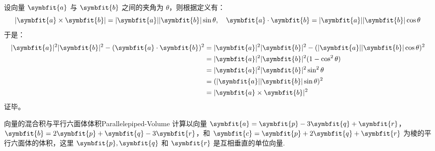 \begin{myproof}
    设向量 $\symbfit{a}$ 与 $\symbfit{b}$ 之间的夹角为 $\theta$，则根据定义有：
    \begin{equation*}
        |\symbfit{a} \times \symbfit{b}| = |\symbfit{a}| |\symbfit{b}| \sin \theta, \quad \symbfit{a} \cdot \symbfit{b} = |\symbfit{a}| |\symbfit{b}| \cos \theta
    \end{equation*}
    于是：
    \begin{equation*}
        \begin{aligned}
            |\symbfit{a}|^2 |\symbfit{b}|^2 - (\symbfit{a} \cdot \symbfit{b})^2 & = |\symbfit{a}|^2 |\symbfit{b}|^2 - (|\symbfit{a}| |\symbfit{b}| \cos \theta)^2 \\
                                                                                & = |\symbfit{a}|^2 |\symbfit{b}|^2 (1 - \cos^2 \theta)                           \\
                                                                                & = |\symbfit{a}|^2 |\symbfit{b}|^2 \sin^2 \theta                                 \\
                                                                                & = (|\symbfit{a}| |\symbfit{b}| \sin \theta)^2                                   \\
                                                                                & = |\symbfit{a} \times \symbfit{b}|^2
        \end{aligned}
    \end{equation*}
    证毕。
\end{myproof}


\begin{problem}{向量的混合积与平行六面体体积}{Parallelepiped-Volume}
    计算以向量 $\symbfit{a} = \symbfit{p} - 3\symbfit{q} + \symbfit{r}$，$\symbfit{b} = 2\symbfit{p} + \symbfit{q} - 3\symbfit{r}$，和 $\symbfit{c} = \symbfit{p} + 2\symbfit{q} + \symbfit{r}$ 为棱的平行六面体的体积，这里 $\symbfit{p}, \symbfit{q}$ 和 $\symbfit{r}$ 是互相垂直的单位向量.
\end{problem}

